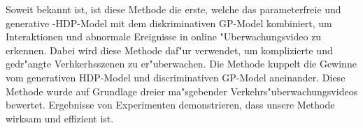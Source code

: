 Soweit bekannt ist, ist diese Methode die erste, welche das parameterfreie und generative -HDP-Model mit dem diskriminativen GP-Model kombiniert, um Interaktionen und abnormale Ereignisse in online "Uberwachungsvideo zu erkennen. Dabei wird diese Methode daf"ur verwendet, um komplizierte und gedr"angte Verhkerhsszenen zu er"uberwachen.
Die Methode kuppelt die Gewinne vom generativen HDP-Model und discriminativen GP-Model aneinander.  
Diese Methode wurde auf Grundlage dreier ma"sgebender Verkehrs"uberwachungsvideos bewertet. Ergebnisse von Experimenten demonstrieren, dass unsere Methode wirksam und effizient ist.
